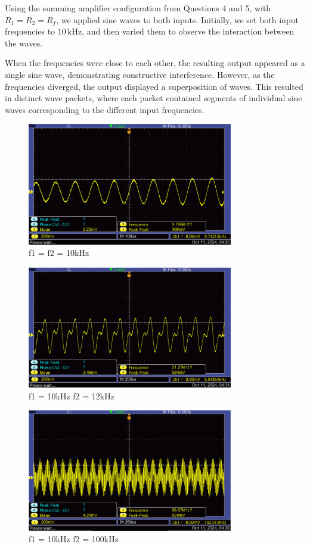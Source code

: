 \documentclass{article}
\begin{document}
Using the summing amplifier configuration from Questions 4 and 5, 
with \( R_1 = R_2 = R_f \), we applied sine waves to both inputs. 
Initially, we set both input frequencies to \( 10 \, \text{kHz} \), 
and then varied them to observe the interaction between the waves.

When the frequencies were close to each other, the resulting 
output appeared as a single sine wave, demonstrating constructive 
interference. However, as the frequencies diverged, the output 
displayed a superposition of waves. This resulted in distinct wave 
packets, where each packet contained segments of individual sine 
waves corresponding to the different input frequencies.

\begin{figure}[H]
    \centering
    \includegraphics[width=0.8\textwidth]{img/Lab 7/b_1.png} 
    \caption{f1 = f2 = 10kHz}
\end{figure}

\begin{figure}[H]
    \centering
    \includegraphics[width=0.8\textwidth]{img/Lab 7/b_2.png}
    \caption{f1 = 10kHz f2 = 12kHz}
\end{figure}

\begin{figure}[H]
    \centering
    \includegraphics[width=0.8\textwidth]{img/Lab 7/b_3.png} 
    \caption{f1 = 10kHz f2 = 100kHz}
\end{figure}
\end{document}
